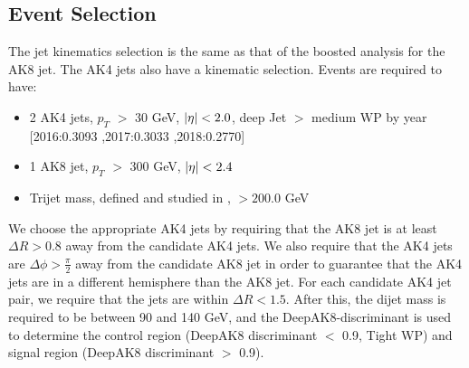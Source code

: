 \subsection{Event Selection\label{sec:EvtSel2p1}} 
The jet kinematics selection is the same as that of the boosted analysis for the AK8 jet. The AK4 jets also have a kinematic selection. Events are required to have:
\begin{itemize}
\item 2 AK4 jets, $p_{T}$ $>$ 30 GeV, $|\eta| < 2.0$, deep Jet $>$ medium WP by year [2016:0.3093 ,2017:0.3033 ,2018:0.2770]
\item 1 AK8 jet, $p_{T}$ $>$ 300 GeV, $|\eta| < 2.4$%
\item Trijet mass, defined and studied in \cite{CMS-PAS-B2G-16-026}, $> 200.0$ GeV
\end{itemize}
We choose the appropriate AK4 jets by requiring that the AK8 jet is at least $\Delta R > 0.8$ away from the candidate AK4 jets. We also require that the AK4 jets are $\Delta \phi > \frac{\pi}{2}$ away from the candidate AK8 jet in order to guarantee that the AK4 jets are in a different hemisphere than the AK8 jet. For each candidate AK4 jet pair, we require that the jets are within $\Delta R < 1.5$. After this, the dijet mass is required to be between 90 and 140 GeV, and the DeepAK8-discriminant is used to determine the control region (DeepAK8 discriminant $<$ 0.9, Tight WP) and signal region (DeepAK8 discriminant $>$ 0.9). 

